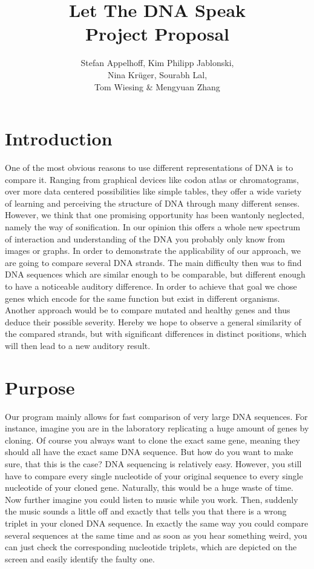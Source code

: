 \documentclass[12pt]{article}
\title{Let The DNA Speak\\Project Proposal}
\author{Stefan Appelhoff, Kim Philipp Jablonski, \\Nina Krüger, Sourabh Lal, \\Tom Wiesing \& Mengyuan Zhang}
\begin{document}
\maketitle

\tableofcontents

\section{Introduction}

One of the most obvious reasons to use different representations of DNA is to compare it. Ranging from graphical devices like codon atlas or chromatograms, over more data centered possibilities like simple tables, they offer a wide variety of learning and perceiving the structure of DNA through many different senses.
However, we think that one promising opportunity has been wantonly neglected, namely the way of sonification. In our opinion this offers a whole new spectrum of interaction and understanding of the DNA you probably only know from images or graphs.
In order to demonstrate the applicability of our approach, we are going to compare several DNA strands. The main difficulty then was to find DNA sequences which are similar enough to be comparable, but different enough to have a noticeable auditory difference.
In order to achieve that goal we chose genes which encode for the same function but exist in different organisms. Another approach would be to compare mutated and healthy genes and thus deduce their possible severity. Hereby we hope to observe a general similarity of the compared strands, but with significant differences in distinct positions, which will then lead to a new auditory result.

\section{Purpose}

Our program mainly allows for fast comparison of very large DNA sequences. For instance, imagine you are in the laboratory replicating a huge amount of genes by cloning. Of course you always want to clone the exact same gene, meaning they should all have the exact same DNA sequence. But how do you want to make sure, that this is the case?
DNA sequencing is relatively easy. However, you still have to compare every single nucleotide of your original sequence to every single nucleotide of your cloned gene. Naturally, this would be a huge waste of time.
Now further imagine you could listen to music while you work. Then, suddenly the music sounds a little off and exactly that tells you that there is a wrong triplet in your cloned DNA sequence. In exactly the same way you could compare several sequences at the same time and as soon as you hear something weird, you can just check the corresponding nucleotide triplets, which are depicted on the screen and easily identify the faulty one. 
\end{document}
